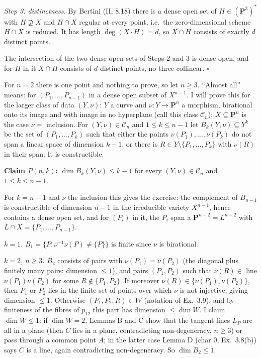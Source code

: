 \documentclass[11pt]{article}
\begin{document}
\emph{Step 3: distinctness.} By Bertini (II, 8.18) there is a dense open set of $H\in(\mathbf P^3)^*$ with $H\not\supseteq X$ and $H\cap X$ regular at every point, i.e.\ the zero-dimensional scheme $H\cap X$ is reduced. It has length $\deg(X\cdot H)=d$, so $X\cap H$ consists of exactly $d$ distinct points.

The intersection of the two dense open sets of Steps 2 and 3 is dense open, and for $H$ in it $X\cap H$ consists of $d$ distinct points, no three collinear. \hfill$\square$

\pf
For $n=2$ there is one point and nothing to prove, so let $n\ge3$. ``Almost all'' means: for $(P_1,\dots,P_{n-1})$ in a dense open subset of $X^{n-1}$. I will prove this for the larger class of data $(Y,\nu)$: $Y$ a curve and $\nu:Y\to\mathbf P^n$ a morphism, birational onto its image and with image in no hyperplane (call this class $\mathcal C_n$); $X\subseteq\mathbf P^n$ is the case $\nu=$ inclusion. For $(Y,\nu)\in\mathcal C_n$ and $1\le k\le n-1$ let $B_k(Y,\nu)\subseteq Y^k$ be the set of $(P_1,\dots,P_k)$ such that either the points $\nu(P_1),\dots,\nu(P_k)$ do not span a linear space of dimension $k-1$, or there is $R\in Y\setminus\{P_1,\dots,P_k\}$ with $\nu(R)$ in their span. It is constructible.

\textbf{Claim $P(n,k)$:} $\dim B_k(Y,\nu)\le k-1$ for every $(Y,\nu)\in\mathcal C_n$ and $1\le k\le n-1$.

For $k=n-1$ and $\nu$ the inclusion this gives the exercise: the complement of $B_{n-1}$ is constructible of dimension $n-1$ in the irreducible variety $X^{n-1}$, hence contains a dense open set, and for $(P_i)$ in it, the $P_i$ span a $\mathbf P^{n-2}=L^{n-2}$ with $L\cap X=\{P_1,\dots,P_{n-1}\}$.

\emph{$k=1$.} $B_1=\{P:\nu^{-1}\nu(P)\ne\{P\}\}$ is finite since $\nu$ is birational.

\emph{$k=2$, $n\ge3$.} $B_2$ consists of pairs with $\nu(P_1)=\nu(P_2)$ (the diagonal plus finitely many pairs: dimension $\le1$), and pairs $(P_1,P_2)$ such that $\nu(R)\in$ line $\nu(P_1)\nu(P_2)$ for some $R\notin\{P_1,P_2\}$. If moreover $\nu(R)\in\{\nu(P_1),\nu(P_2)\}$, then $P_1$ or $P_2$ lies in the finite set of points over which $\nu$ is not injective, giving dimension $\le1$. Otherwise $(P_1,P_2,R)\in W$ (notation of Ex.~3.9), and by finiteness of the fibres of $p_{12}$ this part has dimension $\le\dim W$. I claim $\dim W\le1$: if $\dim W=2$, Lemmas B and C show that the tangent lines $L_P$ are all in a plane (then $C$ lies in a plane, contradicting non-degeneracy, $n\ge3$) or pass through a common point $A$; in the latter case Lemma D (char $0$, Ex.~3.8(b)) says $C$ is a line, again contradicting non-degeneracy. So $\dim B_2\le1$.
\end{document}
